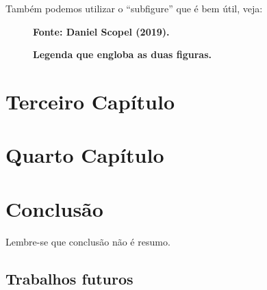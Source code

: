 \documentclass[
	12pt,				%
	openright,			%
	oneside,			%
	a4paper,			%
	chapter=TITLE,		%
	section=TITLE,		%
	subsection=TITLE,	%
	subsubsection=TITLE,%
    subsubsubsection=TITLE,%
	english,			%
    french,
    spanish,
	brazil				%
	]{utfprtex2}
\begin{document}
Também podemos utilizar o ``subfigure'' que é bem útil, veja:
\begin{figure}[H]
\centering
{}
\qquad
{}
\caption{\textbf{Legenda que engloba as duas figuras.}}
\textbf{Fonte: Daniel Scopel (2019).}
\label{fig:ondas3}
\end{figure}


\chapter{Terceiro Capítulo}
\label{chap:um_nome}

\chapter{Quarto Capítulo}
\label{chap:outro_nome}

\chapter{Conclusão}
\label{chap:conclusao}

Lembre-se que conclusão não é resumo.

\section{Trabalhos futuros}





\postextual





\label{page:end}
\end{document}
